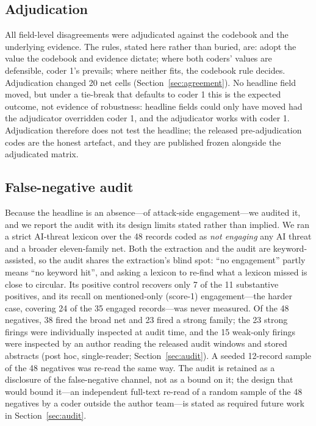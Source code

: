 \documentclass[preprint,12pt]{elsarticle}
\renewcommand{\_}{\plainunderscore\allowbreak}
\begin{document}
\subsection{Adjudication}

All field-level disagreements were adjudicated against the codebook and the underlying evidence.
The rules, stated here rather than buried, are: adopt the value the codebook and evidence
dictate; where both coders' values are defensible, coder 1's prevails; where neither fits, the
codebook rule decides. Adjudication changed 20 net cells (Section~\ref{sec:agreement}). No
headline field moved, but under a tie-break that defaults to coder 1 this is the expected
outcome, not evidence of robustness: headline fields could only have moved had the
adjudicator overridden coder 1, and the adjudicator works with coder 1. Adjudication
therefore does not test the headline; the released pre-adjudication codes are the honest
artefact, and they are published frozen alongside the adjudicated matrix.

\subsection{False-negative audit}

Because the headline is an absence---of attack-side engagement---we audited it, and we
report the audit with its design limits stated rather than implied. We ran a strict
AI-threat lexicon over the 48 records coded as \emph{not engaging} any AI threat and a
broader eleven-family net. Both the extraction and the audit are keyword-assisted, so the
audit shares the extraction's blind spot: ``no engagement'' partly means ``no keyword
hit'', and asking a lexicon to re-find what a lexicon missed is close to circular. Its
positive control recovers only 7 of the 11 substantive positives, and its recall on
mentioned-only (score-1) engagement---the harder case, covering 24 of the 35 engaged
records---was never measured. Of the 48 negatives, 38 fired the broad net and 23 fired a
strong family; the 23 strong firings were individually inspected at audit time, and the
15 weak-only firings were inspected by an author reading the released audit windows and
stored abstracts (post hoc, single-reader; Section~\ref{sec:audit}).
A seeded 12-record sample of the 48 negatives was re-read the same way. The audit is
retained as a disclosure of the false-negative channel, not as a bound on it; the design
that would bound it---an independent full-text re-read of a random sample of the 48
negatives by a coder outside the author team---is stated as required future work in
Section~\ref{sec:audit}.
\end{document}
